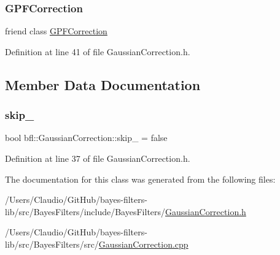 \mbox{\label{classbfl_1_1GaussianCorrection_a5bc4f3f9c22a163bbcaac8d54f37a355}} 
\subsubsection{\texorpdfstring{G\+P\+F\+Correction}{GPFCorrection}}
{\footnotesize\ttfamily friend class \mbox{\hyperlink{classbfl_1_1GPFCorrection}{G\+P\+F\+Correction}}\hspace{0.3cm}{\ttfamily [friend]}}



Definition at line 41 of file Gaussian\+Correction.\+h.



\subsection{Member Data Documentation}
\mbox{\label{classbfl_1_1GaussianCorrection_a6941174f7c3e3bb380e89bb6b4429f5e}} 
\subsubsection{\texorpdfstring{skip\+\_\+}{skip\_}}
{\footnotesize\ttfamily bool bfl\+::\+Gaussian\+Correction\+::skip\+\_\+ = false\hspace{0.3cm}{\ttfamily [private]}}



Definition at line 37 of file Gaussian\+Correction.\+h.



The documentation for this class was generated from the following files\+:\begin{DoxyCompactItemize}
\item 
/\+Users/\+Claudio/\+Git\+Hub/bayes-\/filters-\/lib/src/\+Bayes\+Filters/include/\+Bayes\+Filters/\mbox{\hyperlink{GaussianCorrection_8h}{Gaussian\+Correction.\+h}}\item 
/\+Users/\+Claudio/\+Git\+Hub/bayes-\/filters-\/lib/src/\+Bayes\+Filters/src/\mbox{\hyperlink{GaussianCorrection_8cpp}{Gaussian\+Correction.\+cpp}}\end{DoxyCompactItemize}
